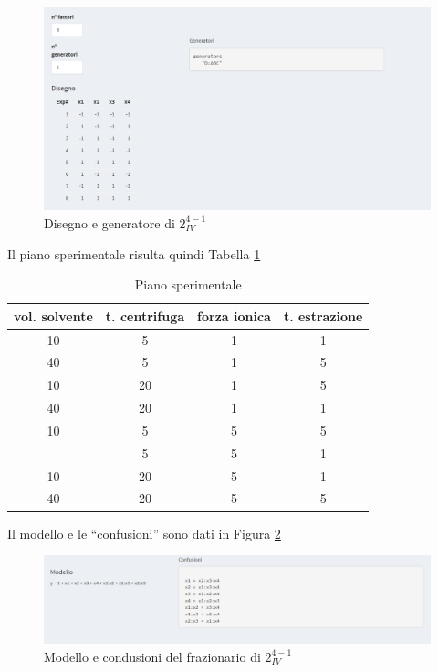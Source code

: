 \documentclass[
  11pt,
]{book}
\begin{document}
\begin{figure}[ht]

{\centering \includegraphics[width=1\linewidth]{Immagini/Fraz/04_esempio1} 

}

\caption{Disegno e generatore di  $2_{IV}^{4-1}$}\label{fig:fz4}
\end{figure}

Il piano sperimentale risulta quindi Tabella \ref{tab:piano}
\newpage

\begin{table}

\caption{\label{tab:piano}Piano sperimentale}
\centering
\begin{tabular}[t]{cccc}
\toprule
vol. solvente & t. centrifuga & forza ionica & t. estrazione\\
\midrule
10 & 5 & 1 & 1\\
40 & 5 & 1 & 5\\
10 & 20 & 1 & 5\\
40 & 20 & 1 & 1\\
10 & 5 & 5 & 5\\
\addlinespace
40 & 5 & 5 & 1\\
10 & 20 & 5 & 1\\
40 & 20 & 5 & 5\\
\bottomrule
\end{tabular}
\end{table}

Il modello e le ``confusioni'' sono dati in Figura \ref{fig:fz5}

\begin{figure}[ht]

{\centering \includegraphics[width=1\linewidth]{Immagini/Fraz/05_esempio2} 

}

\caption{Modello e condusioni del frazionario di  $2_{IV}^{4-1}$}\label{fig:fz5}
\end{figure}
\end{document}
